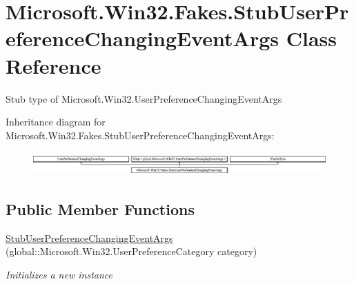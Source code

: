 \hypertarget{class_microsoft_1_1_win32_1_1_fakes_1_1_stub_user_preference_changing_event_args}{\section{Microsoft.\-Win32.\-Fakes.\-Stub\-User\-Preference\-Changing\-Event\-Args Class Reference}
\label{class_microsoft_1_1_win32_1_1_fakes_1_1_stub_user_preference_changing_event_args}
}


Stub type of Microsoft.\-Win32.\-User\-Preference\-Changing\-Event\-Args 


Inheritance diagram for Microsoft.\-Win32.\-Fakes.\-Stub\-User\-Preference\-Changing\-Event\-Args\-:\begin{figure}[H]
\begin{center}
\leavevmode
\includegraphics[height=0.912795cm]{class_microsoft_1_1_win32_1_1_fakes_1_1_stub_user_preference_changing_event_args}
\end{center}
\end{figure}
\subsection*{Public Member Functions}
\begin{DoxyCompactItemize}
\item 
\hyperlink{class_microsoft_1_1_win32_1_1_fakes_1_1_stub_user_preference_changing_event_args_ab0771e285c2950fa2b625e633543ed21}{Stub\-User\-Preference\-Changing\-Event\-Args} (global\-::\-Microsoft.\-Win32.\-User\-Preference\-Category category)
\begin{DoxyCompactList}\small\item\em Initializes a new instance\end{DoxyCompactList}\end{DoxyCompactItemize}
